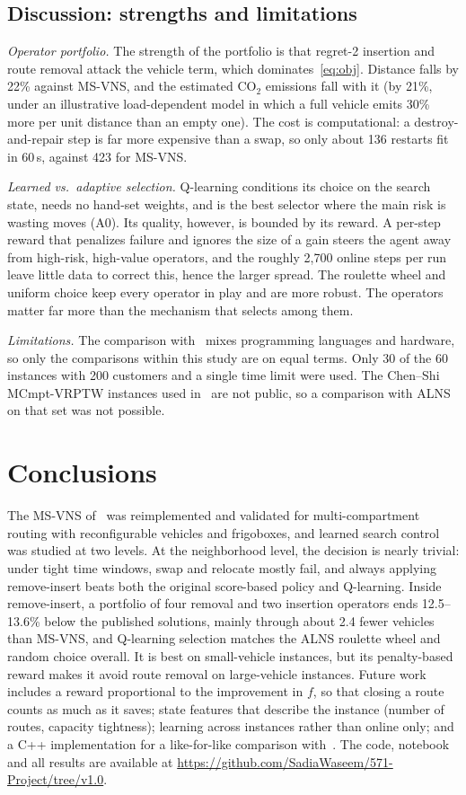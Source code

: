 \documentclass[conference]{IEEEtran}
\begin{document}
\subsection{Discussion: strengths and limitations}
\textit{Operator portfolio.} The strength of the portfolio is that regret-2 insertion and route removal attack the vehicle term, which dominates~\eqref{eq:obj}. Distance falls by 22\% against MS-VNS, and the estimated CO$_2$ emissions fall with it (by 21\%, under an illustrative load-dependent model in which a full vehicle emits 30\% more per unit distance than an empty one). The cost is computational: a destroy-and-repair step is far more expensive than a swap, so only about 136 restarts fit in 60\,s, against 423 for MS-VNS.

\textit{Learned vs.\ adaptive selection.} Q-learning conditions its choice on the search state, needs no hand-set weights, and is the best selector where the main risk is wasting moves (A0). Its quality, however, is bounded by its reward. A per-step reward that penalizes failure and ignores the size of a gain steers the agent away from high-risk, high-value operators, and the roughly 2{,}700 online steps per run leave little data to correct this, hence the larger spread. The roulette wheel and uniform choice keep every operator in play and are more robust. The operators matter far more than the mechanism that selects among them.

\textit{Limitations.} The comparison with~\cite{masmoudi2026} mixes programming languages and hardware, so only the comparisons within this study are on equal terms. Only 30 of the 60 instances with 200 customers and a single time limit were used. The Chen--Shi MCmpt-VRPTW instances used in~\cite{masmoudi2026} are not public, so a comparison with ALNS on that set was not possible.

\section{Conclusions}
The MS-VNS of~\cite{masmoudi2026} was reimplemented and validated for multi-compartment routing with reconfigurable vehicles and frigoboxes, and learned search control was studied at two levels. At the neighborhood level, the decision is nearly trivial: under tight time windows, swap and relocate mostly fail, and always applying remove-insert beats both the original score-based policy and Q-learning. Inside remove-insert, a portfolio of four removal and two insertion operators ends 12.5--13.6\% below the published solutions, mainly through about 2.4 fewer vehicles than MS-VNS, and Q-learning selection matches the ALNS roulette wheel and random choice overall. It is best on small-vehicle instances, but its penalty-based reward makes it avoid route removal on large-vehicle instances. Future work includes a reward proportional to the improvement in $f$, so that closing a route counts as much as it saves; state features that describe the instance (number of routes, capacity tightness); learning across instances rather than online only; and a C++ implementation for a like-for-like comparison with~\cite{masmoudi2026}. The code, notebook and all results are available at \url{https://github.com/SadiaWaseem/571-Project/tree/v1.0}.
\end{document}
